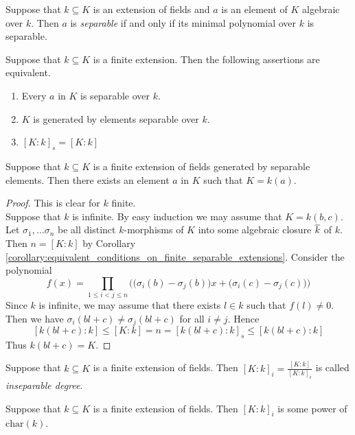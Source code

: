 \begin{definition}
Suppose that $k\subseteq K$ is an extension of fields and $a$ is an element of $K$ algebraic over $k$. Then $a$ is \textit{separable} if and only if its minimal polynomial over $k$ is separable.
\end{definition}


\begin{corollary}\label{corollary:equivalent_conditions_on_finite_separable_extensions}
Suppose that $k\subseteq K$ is a finite extension. Then the following assertions are equivalent.
\begin{enumerate}[label=\emph{\textbf{(\roman*)}}, leftmargin=3.0em]
\item Every $a$ in $K$ is separable over $k$.
\item $K$ is generated by elements separable over $k$.
\item $[K:k]_s=[K:k]$
\end{enumerate}
\end{corollary}

\begin{theorem}\label{theorem:abels_primitive_element_theorem}
Suppose that $k\subseteq K$ is a finite extension of fields generated by separable elements. Then there exists an element $a$ in $K$ such that $K=k(a)$. 
\end{theorem}
\begin{proof}
This is clear for $k$ finite.\\
Suppose that $k$ is infinite. By easy induction we may assume that $K=k(b,c)$. Let $\sigma_1,...\sigma_n$ be all distinct $k$-morphisms of $K$ into some algebraic closure $\overline{k}$ of $k$. Then $n=[K:k]$ by Corollary \ref{corollary:equivalent_conditions_on_finite_separable_extensions}. Consider the polynomial
$$f(x)=\prod_{1\leq i< j\leq n}\bigg(\big(\sigma_i(b)-\sigma_j(b)\big)x+\big(\sigma_i(c)-\sigma_j(c)\big)\bigg)$$
Since $k$ is infinite, we may assume that there exists $l\in k$ such that $f(l)\neq 0$. Then we have $\sigma_i(bl+c)\neq \sigma_j(bl+c)$ for all $i\neq j$. Hence
$$[k(bl+c):k] \leq [K:k]=n= [k(bl+c):k]_s\leq [k(bl+c):k]$$
Thus $k(bl+c)=K$.
\end{proof}

\begin{definition}
Suppose that $k\subseteq K$ is a finite extension of fields. Then $[K:k]_i=\frac{[K:k]}{[K:k]_s}$ is called \textit{inseparable degree}.
\end{definition}

\begin{corollary}
Suppose that $k\subseteq K$ is a finite extension of fields. Then $[K:k]_i$ is some power of $\mathrm{char}(k)$.
\end{corollary}

